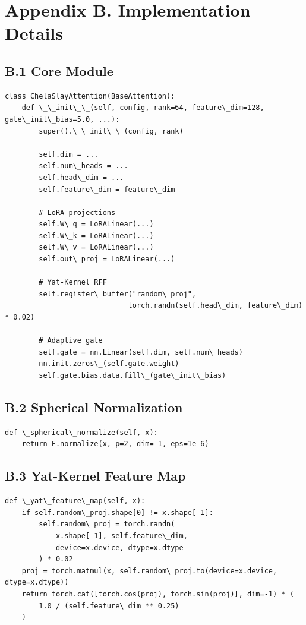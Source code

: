 \section{Appendix B. Implementation Details}

\subsection{B.1 Core Module}

\begin{lstlisting}
class ChelaSlayAttention(BaseAttention):
    def \_\_init\_\_(self, config, rank=64, feature\_dim=128, gate\_init\_bias=5.0, ...):
        super().\_\_init\_\_(config, rank)
        
        self.dim = ...
        self.num\_heads = ...
        self.head\_dim = ...
        self.feature\_dim = feature\_dim
        
        # LoRA projections
        self.W\_q = LoRALinear(...)
        self.W\_k = LoRALinear(...)
        self.W\_v = LoRALinear(...)
        self.out\_proj = LoRALinear(...)
        
        # Yat-Kernel RFF
        self.register\_buffer("random\_proj", 
                             torch.randn(self.head\_dim, feature\_dim) * 0.02)
        
        # Adaptive gate
        self.gate = nn.Linear(self.dim, self.num\_heads)
        nn.init.zeros\_(self.gate.weight)
        self.gate.bias.data.fill\_(gate\_init\_bias)
\end{lstlisting}

\subsection{B.2 Spherical Normalization}

\begin{lstlisting}
def \_spherical\_normalize(self, x):
    return F.normalize(x, p=2, dim=-1, eps=1e-6)
\end{lstlisting}

\subsection{B.3 Yat-Kernel Feature Map}

\begin{lstlisting}
def \_yat\_feature\_map(self, x):
    if self.random\_proj.shape[0] != x.shape[-1]:
        self.random\_proj = torch.randn(
            x.shape[-1], self.feature\_dim, 
            device=x.device, dtype=x.dtype
        ) * 0.02
    proj = torch.matmul(x, self.random\_proj.to(device=x.device, dtype=x.dtype))
    return torch.cat([torch.cos(proj), torch.sin(proj)], dim=-1) * (
        1.0 / (self.feature\_dim ** 0.25)
    )
\end{lstlisting}

